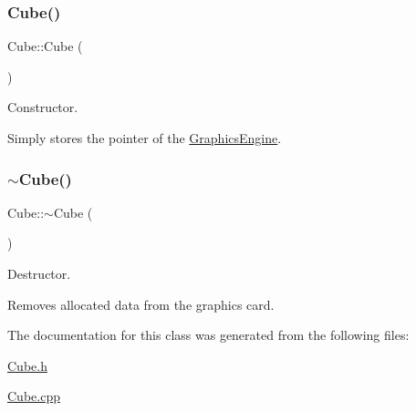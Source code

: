 \subsubsection{\texorpdfstring{Cube()}{Cube()}}
{\footnotesize\ttfamily Cube\+::\+Cube (\begin{DoxyParamCaption}{ }\end{DoxyParamCaption})}



Constructor. 

Simply stores the pointer of the \hyperlink{class_graphics_engine}{Graphics\+Engine}. \mbox{\label{class_cube_aa814e979cecb8c451fdb332ded2cea1e}} 
\subsubsection{\texorpdfstring{$\sim$\+Cube()}{~Cube()}}
{\footnotesize\ttfamily Cube\+::$\sim$\+Cube (\begin{DoxyParamCaption}{ }\end{DoxyParamCaption})}



Destructor. 

Removes allocated data from the graphics card. 

The documentation for this class was generated from the following files\+:\begin{DoxyCompactItemize}
\item 
\hyperlink{_cube_8h}{Cube.\+h}\item 
\hyperlink{_cube_8cpp}{Cube.\+cpp}\end{DoxyCompactItemize}
